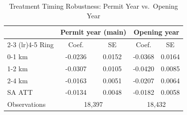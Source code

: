 \begin{table}[htbp]
\centering
\caption{Treatment Timing Robustness: Permit Year vs.\ Opening Year}
\label{tab:appx_opening}
\small
\begin{tabular}{lcccc}
\toprule
& \multicolumn{2}{c}{Permit year (main)} & \multicolumn{2}{c}{Opening year} \\
\cmidrule(lr){2-3} \cmidrule(lr){4-5}
Ring & Coef. & SE & Coef. & SE \\
\midrule
0-1 km & -0.0236 & 0.0152 & -0.0368 & 0.0164 \\
1-2 km & -0.0307 & 0.0105 & -0.0420 & 0.0085 \\
2-4 km & -0.0163 & 0.0051 & -0.0207 & 0.0064 \\
\midrule
SA ATT & -0.0134 & 0.0048 & -0.0182 & 0.0058 \\
Observations & \multicolumn{2}{c}{18,397} & \multicolumn{2}{c}{18,432} \\
\bottomrule
\end{tabular}
\end{table}
